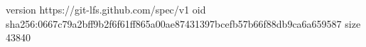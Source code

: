 version https://git-lfs.github.com/spec/v1
oid sha256:0667c79a2bff9b2f6f61ff865a00ae87431397bcefb57b66f88db9ca6a659587
size 43840
